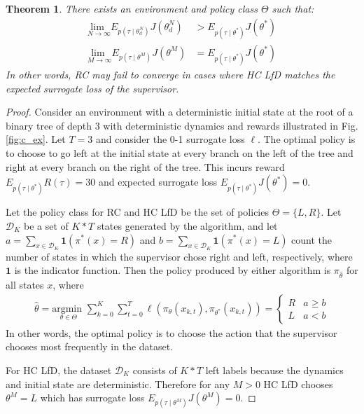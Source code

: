 \documentclass[10pt, conference]{ieeeconf}      %
\newtheorem{theorem}{Theorem}[section]
\newcommand{\mD}{\mathcal{D}}
\begin{document}
\begin{theorem}
There exists an environment and policy class $\Theta$ such that:
\begin{align*}
	\underset{N \rightarrow \infty}{\text{lim }} E_{p(\tau \mid \theta_{d}^N) } J(\theta_{d}^N) &> E_{p(\tau \mid \theta^*)} J(\theta^*) \\
	\underset{M \rightarrow \infty}{\text{lim }} E_{p(\tau \mid \theta^M) } J(\theta^M) &= E_{p(\tau \mid \theta^*)} J(\theta^*)
\end{align*} 
\noindent In other words, RC may fail to converge in cases where HC LfD matches the expected surrogate loss of the supervisor. 
\end{theorem}

\begin{proof}
Consider an environment with a deterministic initial state at the root of a binary tree of depth 3 with deterministic dynamics and rewards illustrated in Fig. \ref{fig:c_ex}.
Let $T = 3$ and consider the 0-1 surrogate loss $\ell$.
The optimal policy is to choose to go left at the initial state at every branch on the left of the tree and right at every branch on the right of the tree.
This incurs reward $E_{p(\tau \mid \theta^*)} R(\tau) = 30$ and expected surrogate loss $E_{p(\tau \mid \theta^*)} J(\theta^*) = 0$.

Let the policy class for RC and HC LfD be the set of policies $\Theta = \{L, R\}$.
Let $\mD_K$ be a set of $K * T$ states generated by the algorithm, and let $a = \sum_{x \in \mD_K} \mathbf{1}(\pi^*(x) = R)$ and $b = \sum_{x \in \mD_K} \mathbf{1}(\pi^*(x) = L)$ count the number of states in which the supervisor chose right and left, respectively, where $\mathbf{1}$ is the indicator function. 
Then the policy produced by either algorithm is $\pi_{\hat{\theta}}$ for all states $x$, where
\vspace{-2ex}
\begin{align*}
	\hat{\theta} = \underset{\theta \in \Theta}{\text{argmin }} \sum_{k=0}^K \sum_{t=0}^T \ell(\pi_{\theta}(x_{k,t}), \pi_{\theta^*}(x_{k,t})) = \left\{ \begin{array}{cc} R & a \geq b \\ L & a < b \end{array} \right.
\end{align*}
\noindent In other words, the optimal policy is to choose the action that the supervisor chooses most frequently in the dataset.

For HC LfD, the dataset $\mD_K$ consists of $K * T$ left labels because the dynamics and initial state are deterministic.
Therefore for any $M > 0$  HC LfD chooses $\theta^M = L$ which has surrogate loss $E_{p(\tau \mid \theta^M)} J(\theta^M) = 0$.


\end{proof}
\end{document}
